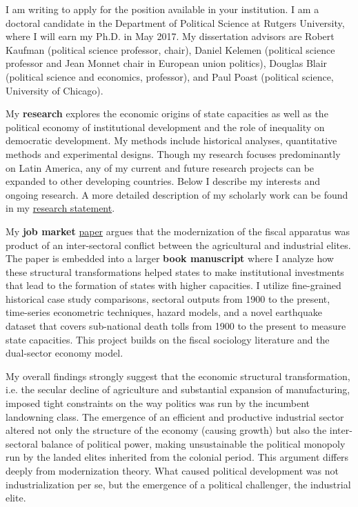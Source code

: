 \documentclass[10pt,stdletter,dateno,sigleft]{newlfm} %
\begin{document}
\begin{newlfm}


\vspace{-0.3cm}I am writing to apply for the position available in your institution. I am a doctoral candidate in the Department of Political Science at Rutgers University, where I will earn my Ph.D. in May 2017. My dissertation advisors are Robert Kaufman (political science professor, chair), Daniel Kelemen (political science professor and Jean Monnet chair in European union politics), Douglas Blair (political science and economics, professor), and Paul Poast (political science, University of Chicago).

My {\bf research} explores the economic origins of state capacities as well as the political economy of institutional development and the role of inequality on democratic development. My methods include historical analyses, quantitative methods and experimental designs. Though my research focuses predominantly on Latin America, any of my current and future research projects can be expanded to other developing countries. Below I describe my interests and ongoing research. A more detailed description of my scholarly work can be found in my \href{http://github.com/hbahamonde/Job_Market/raw/master/Bahamonde_Research_Statement.pdf}{research statement}.


My {\bf job market} \href{https://github.com/hbahamonde/IncomeTaxAdoption/raw/master/Bahamonde_IncomeTaxAdoption.pdf}{paper} argues that the modernization of the fiscal apparatus was product of an inter-sectoral conflict between the agricultural and industrial elites. The paper is embedded into a larger {\bf book manuscript} where I analyze how these structural transformations helped states to make institutional investments that lead to the formation of states with higher capacities. I utilize fine-grained historical case study comparisons, sectoral outputs from 1900 to the present, time-series econometric techniques, hazard models, and a novel earthquake dataset that covers sub-national death tolls from 1900 to the present to measure state capacities. This project builds on the fiscal sociology literature and the dual-sector economy model. 

My overall findings strongly suggest that the economic structural transformation, i.e. the secular decline of agriculture and substantial expansion of manufacturing, imposed tight constraints on the way politics was run by the incumbent landowning class. The emergence of an efficient and productive industrial sector altered not only the structure of the economy (causing growth) but also the inter-sectoral balance of political power, making unsustainable the political monopoly run by the landed elites inherited from the colonial period. This argument differs deeply from modernization theory. What caused political development was not industrialization per se, but the emergence of a political challenger, the industrial elite.



\end{newlfm}
\end{document}
